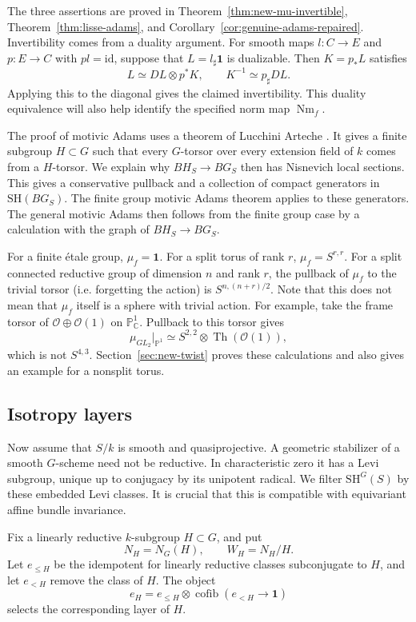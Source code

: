 \documentclass[11pt,reqno]{amsart}
\theoremstyle{definition}
\theoremstyle{remark}
\theoremstyle{plain}
\numberwithin{equation}{section}
\newcommand{\SH}{\mathrm{SH}}
\newcommand{\one}{\mathbf 1}
\newcommand{\Pj}{\mathbb P}
\DeclareMathOperator{\Th}{Th}
\DeclareMathOperator{\cofib}{cofib}
\newcommand{\Nm}{\operatorname{Nm}}
\begin{document}
The three assertions are proved in
Theorem~\ref{thm:new-mu-invertible}, Theorem~\ref{thm:lisse-adams},
and Corollary~\ref{cor:genuine-adams-repaired}.
Invertibility comes from a duality argument.
For smooth maps \(l:C\to E\) and \(p:E\to C\) with \(pl=\mathrm{id}\),
suppose that \(L=l_\sharp\one\) is dualizable.
Then \(K=p_*L\) satisfies
\[
 L\simeq DL\otimes p^*K,
 \qquad K^{-1}\simeq p_\sharp DL.
\]
Applying this to the diagonal gives the claimed invertibility.
This duality equivalence will also help identify the
specified norm map \(\Nm_f\).

The proof of motivic Adams uses a theorem of Lucchini Arteche
\cite[Corollary~18]{LA}.
It gives a finite subgroup \(H\subset G\) such that every
\(G\)-torsor over every extension field of \(k\) comes from a \(H\)-torsor.
We explain why \(BH_S\to BG_S\) then has Nisnevich local sections.
This gives a conservative pullback and a collection of compact generators in \(\SH(BG_S)\).
The finite group motivic Adams theorem applies to these generators.
The general motivic Adams then follows from the finite group case 
by a calculation with the graph of \(BH_S\to BG_S\).

For a finite \'etale group, \(\mu_f=\one\).
For a split torus of rank \(r\), \(\mu_f=S^{r,r}\).
For a split connected reductive group of dimension \(n\) and rank \(r\),
the pullback of \(\mu_f\) to the trivial torsor (i.e. forgetting the action) is \(S^{n,(n+r)/2}\).
Note that this does not mean that \(\mu_f\) itself is a sphere with trivial action.
For example, take the frame torsor of \(\mathcal O\oplus\mathcal O(1)\)
on \(\Pj^1_{\mathbb C}\). Pullback to this torsor gives
\[
 \mu_{GL_2}|_{\Pj^1}
   \simeq S^{2,2}\otimes\Th(\mathcal O(1)),
\]
which is not \(S^{4,3}\).
Section~\ref{sec:new-twist} proves these calculations and also gives
an example for a nonsplit torus.

\subsection{Isotropy layers}

Now assume that \(S/k\) is smooth and quasiprojective.
A geometric stabilizer of a smooth \(G\)-scheme need not be reductive.
In characteristic zero it has a Levi subgroup, unique up to conjugacy
by its unipotent radical.
We filter \(\SH^G(S)\) by these embedded Levi classes.
It is crucial that this is compatible with equivariant affine bundle invariance.

Fix a linearly reductive \(k\)-subgroup \(H\subset G\), and put
\[
 N_H=N_G(H),\qquad W_H=N_H/H.
\]
Let \(e_{\le H}\) be the idempotent for linearly reductive classes
subconjugate to \(H\), and let \(e_{<H}\) remove the class of \(H\).
The object
\[
 e_H=e_{\le H}\otimes\cofib(e_{<H}\to\one)
\]
selects the corresponding layer of \(H\).
\end{document}
